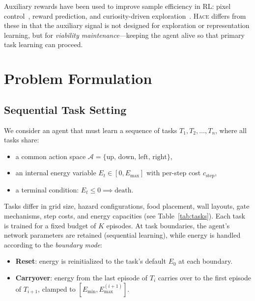 \documentclass{article}
\newcommand{\energy}{E}
\newcommand{\hace}{\textsc{Hace}}
\begin{document}
Auxiliary rewards have been used to improve sample efficiency in RL:
pixel control~\cite{jaderberg2017}, reward prediction, and curiosity-driven
exploration~\cite{pathak2017}. \hace{} differs from these in that the
auxiliary signal is not designed for exploration or representation learning,
but for \emph{viability maintenance}—keeping the agent alive so that
primary task learning can proceed.

\section{Problem Formulation}
\label{sec:problem}

\subsection{Sequential Task Setting}

We consider an agent that must learn a sequence of tasks
$T_1, T_2, \ldots, T_n$, where all tasks share:
\begin{itemize}[leftmargin=*,topsep=1pt,itemsep=1pt]
  \item a common action space $\mathcal{A} = \{\text{up, down, left, right}\}$,
  \item an internal energy variable $\energy_t \in [0, \energy_{\max}]$ with
        per-step cost $c_{\text{step}}$,
  \item a terminal condition: $\energy_t \leq 0 \implies \text{death}$.
\end{itemize}

Tasks differ in grid size, hazard configurations, food placement, wall
layouts, gate mechanisms, step costs, and energy capacities (see
Table~\ref{tab:tasks}). Each task is trained for a fixed budget of
$K$ episodes. At task boundaries, the agent's network parameters are
retained (sequential learning), while energy is handled according to
the \emph{boundary mode}:

\begin{itemize}[leftmargin=*,topsep=1pt,itemsep=1pt]
  \item \textbf{Reset}: energy is reinitialized to the task's default
        $\energy_0$ at each boundary.
  \item \textbf{Carryover}: energy from the last episode of $T_i$
        carries over to the first episode of $T_{i+1}$, clamped to
        $[\energy_{\min}, \energy_{\max}^{(i+1)}]$.
\end{itemize}
\end{document}
